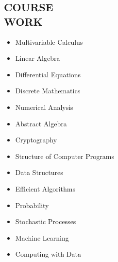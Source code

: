 \documentclass[margin, 8pt]{res} %
\begin{document}
\begin{resume}
\section{COURSE \\ WORK}             
               \begin{multicols}{2}
	       \begin{itemize}\itemsep -2pt
		\item Multivariable Calculus\\
 		\item Linear Algebra\\
		\item Differential Equations\\
		\item Discrete Mathematics\\
		\item Numerical Analysis\\
                \item Abstract Algebra\\
		\item Cryptography\\
                \item Structure of Computer Programs\\
		\item Data Structures\\
                \item Efficient Algorithms\\
		\item Probability\\
		\item Stochastic Processes\\
		\item Machine Learning\\
                \item Computing with Data\\
		\end{itemize}
	       \end{multicols}




\end{resume}
\end{document}
